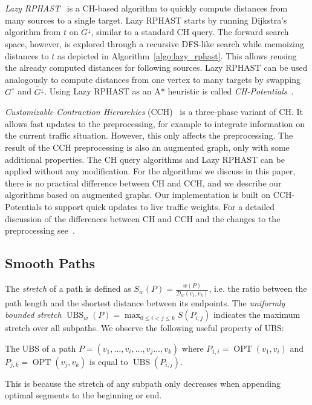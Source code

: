 \documentclass[a4paper,UKenglish,cleveref, autoref, thm-restate]{lipics-v2021}
\newcommand*{\dist}{\mathcal{D}}
\newcommand*{\shp}{\operatorname{OPT}}
\newcommand*{\ubs}{\operatorname{UBS}}
\newcommand*{\gchu}{G^{\uparrow}}
\newcommand*{\gchd}{\overleftarrow{G^{\downarrow}}}
\begin{document}
\emph{Lazy RPHAST}~\cite{strasser_et_al:LIPIcs.SEA.2021.6} is a CH-based algorithm to quickly compute distances from many sources to a single target.
Lazy RPHAST starts by running Dijkstra's algorithm from $t$ on $\gchd$, similar to a standard CH query.
The forward search space, however, is explored through a recursive DFS-like search while memoizing distances to $t$ as depicted in Algorithm~\ref{algo:lazy_rphast}.
This allows reusing the already computed distances for following sources.
Lazy RPHAST can be used analogously to compute distances from one vertex to many targets by swapping $\gchu$ and $\gchd$.
Using Lazy RPHAST as an A* heuristic is called \emph{CH-Potentials}~\cite{strasser_et_al:LIPIcs.SEA.2021.6}.

\emph{Customizable Contraction Hierarchies} (CCH)~\cite{dsw-cch-15} is a three-phase variant of CH.
It allows fast updates to the preprocessing, for example to integrate information on the current traffic situation.
However, this only affects the preprocessing.
The result of the CCH preprocessing is also an augmented graph, only with some additional properties.
The CH query algorithms and Lazy RPHAST can be applied without any modification.
For the algorithms we discuss in this paper, there is no practical difference between CH and CCH, and we describe our algorithms based on augmented graphs.
Our implementation is built on CCH-Potentials to support quick updates to live traffic weights.
For a detailed discussion of the differences between CH and CCH and the changes to the preprocessing see~\cite{dsw-cch-15}.

\subsection{Smooth Paths}

The \emph{stretch} of a path is defined as $S_w(P) = \frac{w(P)}{\dist_w(v_1, v_k)}$, i.e. the ratio between the path length and the shortest distance between its endpoints.
The \emph{uniformly bounded stretch} $\ubs_w(P) = \max_{0 \leq i < j \leq k}S(P_{i,j})$ indicates the maximum stretch over all subpaths.
We observe the following useful property of UBS:
\begin{observation}\label{obs:append_sp_ubs}
The UBS of a path $P = (v_1, \dots, v_i, \dots, v_j \dots, v_k)$ where $P_{1,i} = \shp(v_1, v_i)$ and $P_{j,k} = \shp(v_j, v_k)$ is equal to $\ubs(P_{i,j})$.
\end{observation}
This is because the stretch of any subpath only decreases when appending optimal segments to the beginning or end.
\end{document}
